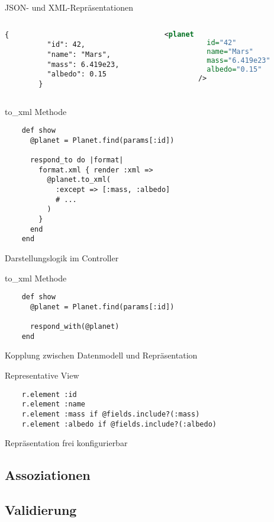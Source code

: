 \begin{frame}[fragile]{JSON- und XML-Repräsentationen}

  \begin{columns}[t]
    \begin{column}{.45\textwidth}
      \begin{lstlisting}[language={},gobble=8]
        {
          "id": 42,
          "name": "Mars",
          "mass": 6.419e23,
          "albedo": 0.15
        }
      \end{lstlisting}
    \end{column}
    \begin{column}{.45\textwidth}
      \begin{lstlisting}[language=XML,gobble=8]
        <planet
          id="42"
          name="Mars"
          mass="6.419e23"
          albedo="0.15"
        />
      \end{lstlisting}
    \end{column}
  \end{columns}
\end{frame}

\begin{frame}[fragile]{to\_xml Methode}
  \begin{lstlisting}
    def show
      @planet = Planet.find(params[:id])

      respond_to do |format|
        format.xml { render :xml =>
          @planet.to_xml(
            :except => [:mass, :albedo]
            # ...
          )
        }
      end
    end
  \end{lstlisting}

  Darstellungslogik im Controller \badmark
\end{frame}

\begin{frame}[fragile]{to\_xml Methode}
  \begin{lstlisting}
    def show
      @planet = Planet.find(params[:id])

      respond_with(@planet)
    end
  \end{lstlisting}

  Kopplung zwischen Datenmodell und Repräsentation \badmark
\end{frame}

\begin{frame}[fragile]{Representative View}
  \begin{lstlisting}
    r.element :id
    r.element :name
    r.element :mass if @fields.include?(:mass)
    r.element :albedo if @fields.include?(:albedo)
  \end{lstlisting}

  Repräsentation frei konfigurierbar \goodmark
\end{frame}

\subsection{Assoziationen}


\subsection{Validierung}



